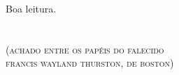 Boa leitura.



%
%

\chapter*{}
\begin{center}
\begin{vplace}[0.3]
\Large
{}\break\normalsize\textsc{(achado entre os papéis do falecido\\ francis wayland thurston, de boston)}\\
\end{vplace}
\end{center}
\thispagestyle{empty}



